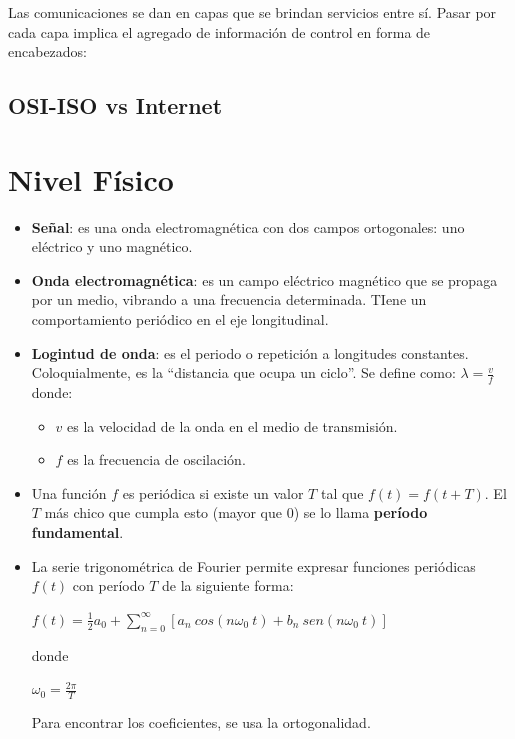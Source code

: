 \documentclass[]{article}
\begin{document}
Las comunicaciones se dan en capas que se brindan servicios entre sí. Pasar por cada capa implica el agregado de información de control en forma de encabezados:


\subsection{OSI-ISO vs Internet}


\section{Nivel Físico}
\begin{itemize}
    \item \textbf{Señal}: es una onda electromagnética con dos campos ortogonales: uno eléctrico y uno magnético.
    \item \textbf{Onda electromagnética}: es un campo eléctrico magnético que se propaga por un medio, vibrando a una frecuencia determinada. TIene un comportamiento periódico en el eje longitudinal.
    \item \textbf{Logintud de onda}: es el periodo o repetición a longitudes constantes. Coloquialmente, es la ``distancia que ocupa un ciclo''. Se define como: $\displaystyle \lambda = \frac{v}{f}$ donde:
    \begin{itemize}
        \item $v$ es la velocidad de la onda en el medio de transmisión.
        \item $f$ es la frecuencia de oscilación.
    \end{itemize}
    \item Una función $f$ es periódica si existe un valor $T$ tal que $f(t) = f(t + T)$. El $T$ más chico que cumpla esto (mayor que 0) se lo llama \textbf{período fundamental}.
    \item La serie trigonométrica de Fourier permite expresar funciones periódicas $f(t)$ con período $T$ de la siguiente forma:
    \begin{center}
        $f(t) = \displaystyle \frac{1}{2}a_0 + \sum_{n=0}^{\infty}[a_n\ cos(n\omega_0\ t) + b_n\ sen(n\omega_0\ t)]$
    \end{center}
    donde
    \begin{center}
        $\omega_0 = \displaystyle \frac{2\pi}{T}$
    \end{center}

    Para encontrar los coeficientes, se usa la ortogonalidad.
\end{itemize}
\end{document}
